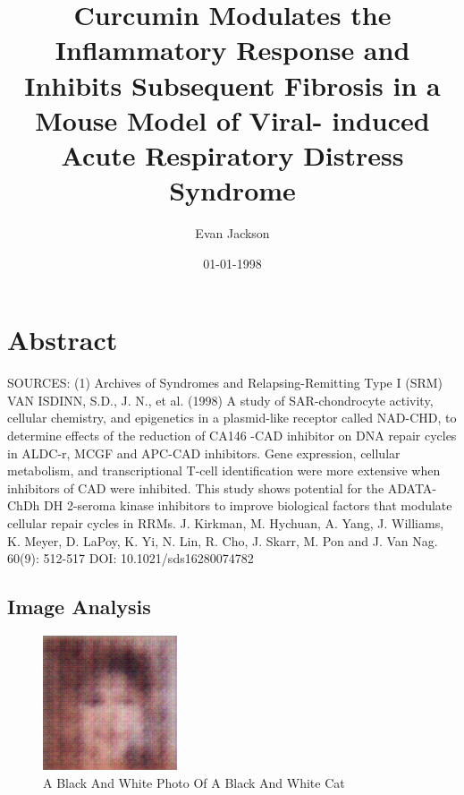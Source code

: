\documentclass{article}%
\title{Curcumin Modulates the Inflammatory Response and Inhibits Subsequent Fibrosis in a Mouse Model of Viral{-} induced Acute Respiratory Distress Syndrome}%
\author{Evan Jackson}%
\affil{School of Dentistry, Chung Shan Medical University, Taichung 40201, Taiwan}%
\date{01{-}01{-}1998}%
\begin{document}
%
\normalsize%
\maketitle%
\section{Abstract}%
\label{sec:Abstract}%
SOURCES: (1) Archives of Syndromes and Relapsing{-}Remitting Type I (SRM)\newline%
VAN ISDINN, S.D., J. N., et al. (1998) A study of SAR{-}chondrocyte activity, cellular chemistry, and epigenetics in a plasmid{-}like receptor called NAD{-}CHD, to determine effects of the reduction of CA146 {-}CAD inhibitor on DNA repair cycles in ALDC{-}r, MCGF and APC{-}CAD inhibitors. Gene expression, cellular metabolism, and transcriptional T{-}cell identification were more extensive when inhibitors of CAD were inhibited. This study shows potential for the ADATA{-}ChDh DH 2{-}seroma kinase inhibitors to improve biological factors that modulate cellular repair cycles in RRMs. J. Kirkman, M. Hychuan, A. Yang, J. Williams, K. Meyer, D. LaPoy, K. Yi, N. Lin, R. Cho, J. Skarr, M. Pon and J. Van Nag. 60(9): 512{-}517 DOI: 10.1021/sds16280074782

%
\subsection{Image Analysis}%
\label{subsec:ImageAnalysis}%


\begin{figure}[h!]%
\centering%
\includegraphics[width=150px]{500_fake_images/samples_5_261.png}%
\caption{A Black And White Photo Of A Black And White Cat}%
\end{figure}

%
\end{document}
